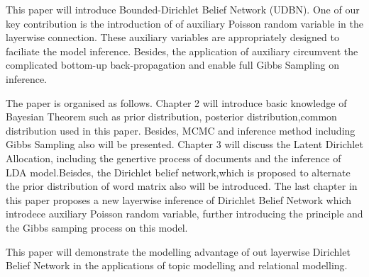 This paper will introduce Bounded-Dirichlet Belief Network (UDBN). One of our key contribution is the introduction of of auxiliary Poisson random variable in the layerwise connection. These auxiliary variables are appropriately designed to faciliate the model inference. Besides, the application of auxiliary circumvent the complicated bottom-up back-propagation and enable full Gibbs Sampling on inference.

The paper is organised as follows. Chapter 2  will introduce basic knowledge of Bayesian Theorem such as prior distribution, posterior distribution,common distribution used in this paper. Besides, MCMC and inference method including Gibbs Sampling also will be presented. Chapter 3 will discuss the Latent Dirichlet Allocation, including the genertive process of documents and the inference of LDA model.Beisdes, the Dirichlet belief network,which is proposed to alternate the prior distribution of word matrix also will be introduced. The last chapter in this paper proposes a new layerwise inference of Dirichlet Belief Network which introdece auxiliary Poisson random variable, further introducing the principle and the Gibbs samping process on this model.

This paper will demonstrate the modelling advantage of out layerwise  Dirichlet Belief Network in the applications of topic modelling and relational modelling.
